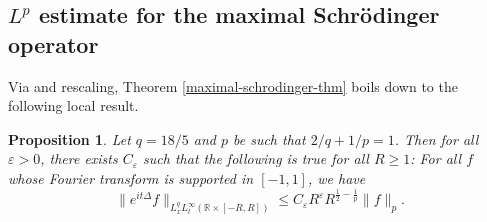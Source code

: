 \documentclass{amsart}
\numberwithin{equation}{section}
\newtheorem{proposition}[theorem]{Proposition}
\newcommand{\De}{\Delta}
\newcommand{\e}{\varepsilon}
\newcommand{\ZR}{\mathbb{R}}
\begin{document}
\medskip



\subsection{\texorpdfstring{$L^p$}{} estimate for the maximal Schr\"odinger operator}


Via \cite[Proposition 5.1]{Lee-Rogers-Seeger} and rescaling, Theorem \ref{maximal-schrodinger-thm} boils down to the following local result.
\begin{proposition}
\label{Schrodinger-prop}
Let $q=18/5$ and $p$ be such that $2/q+1/p=1$.
Then for all $\e>0$, there exists $C_\e$ such that the following is true for all $R\geq1$:
For all $f$ whose Fourier transform is supported in $[-1,1]$, we have
\begin{equation}
    \|e^{it\De}f\|_{L^q_xL^\infty_t(\ZR\times[-R,R])}\leq C_\e R^\e R^{\frac{1}{2}-\frac{1}{p}}\|f\|_{p}.
\end{equation}
\end{proposition}
\end{document}
